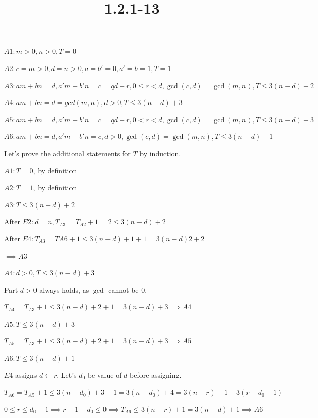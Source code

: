 \documentclass{article}
\title{1.2.1-13}
\begin{document}
\maketitle

$A1: m > 0, n > 0, T = 0$

$A2: c = m > 0, d = n > 0, a = b' = 0, a' = b = 1, T = 1$

$A3: am + bn = d, a'm + b'n = c = qd + r, 0 \leq r < d, \gcd(c, d) = \gcd(m, n), T \leq 3(n-d) + 2$

$A4: am + bn = d = gcd(m, n), d > 0, T \leq 3(n - d) + 3$

$A5: am + bn = d, a'm + b'n = c = qd + r, 0 < r < d, \gcd(c, d) = \gcd(m, n), T \leq 3(n-d) + 3$

$A6: am + bn = d, a'm + b'n = c, d > 0, \gcd(c, d) = \gcd(m, n), T \leq 3(n-d) + 1$

Let's prove the additional statements for $T$ by induction.

$A1: T = 0$, by definition

$A2: T=1$, by definition

$A3: T \leq 3(n-d)+2$

After $E2: d=n, T_{A3}=T_{A2} + 1 = 2 \leq 3(n-d) + 2$

After $E4: T_{A3} = T{A6} + 1 \leq 3(n-d)+1+1 = 3(n-d)2 + 2$

$\implies A3$

$A4: d > 0, T \leq 3(n-d)+3$

Part $d > 0$ always holds, as $\gcd$ cannot be $0$.

$T_{A4} = T_{A3} + 1 \leq 3(n - d)+2 + 1 = 3(n-d)+3 \implies A4$

$A5: T \leq 3(n-d) + 3$

$T_{A5} = T_{A3} + 1 \leq 3(n - d)+2 + 1 = 3(n-d)+3 \implies A5$

$A6: T \leq 3(n-d)+1$

$E4$ assigns $d \leftarrow r$. Let's $d_0$ be value of $d$ before assigning.

$T_{A6} = T_{A5} + 1 \leq 3(n-d_0)+3+1 = 3(n-d_0)+4 = 3(n-r)+1+3(r-d_0+1)$

$0 \leq r \leq d_0 - 1 \implies r + 1 - d_0 \leq 0 \implies T_{A6} \leq 3(n-r)+1 = 3(n-d)+1 \implies A6$
\end{document}
